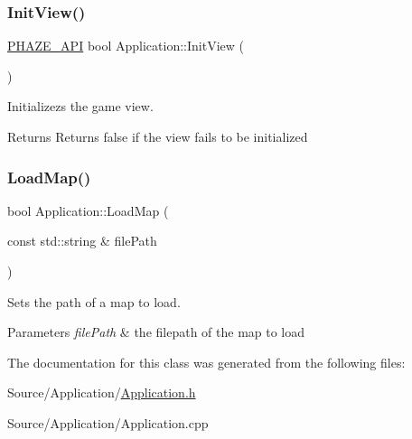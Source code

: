 \subsubsection{\texorpdfstring{Init\+View()}{InitView()}}
{\footnotesize\ttfamily \mbox{\hyperlink{_macros_8h_a9ce0e6835f82908079752fa4ebe70dc9}{P\+H\+A\+Z\+E\+\_\+\+A\+PI}} bool Application\+::\+Init\+View (\begin{DoxyParamCaption}{ }\end{DoxyParamCaption})}



Initializezs the game view. 

\begin{DoxyReturn}{Returns}
Returns false if the view fails to be initialized 
\end{DoxyReturn}
\mbox{\label{class_application_a5cce771d4da11e5ebbf573206775cd41}} 
\subsubsection{\texorpdfstring{Load\+Map()}{LoadMap()}}
{\footnotesize\ttfamily bool Application\+::\+Load\+Map (\begin{DoxyParamCaption}\item[{const std\+::string \&}]{file\+Path }\end{DoxyParamCaption})}



Sets the path of a map to load. 


\begin{DoxyParams}{Parameters}
{\em file\+Path} & the filepath of the map to load \\
\hline
\end{DoxyParams}


The documentation for this class was generated from the following files\+:\begin{DoxyCompactItemize}
\item 
Source/\+Application/\mbox{\hyperlink{_application_8h}{Application.\+h}}\item 
Source/\+Application/Application.\+cpp\end{DoxyCompactItemize}
